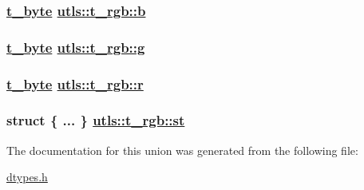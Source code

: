 \hypertarget{unionutls_1_1t__rgb_debb0d24da836f9eb6001f3889fac9d4}{
\subsubsection[b]{\setlength{\rightskip}{0pt plus 5cm}\hyperlink{namespaceutls_dc090f96c41011207bfa8d70a498322f}{t\_\-byte} \hyperlink{unionutls_1_1t__rgb_debb0d24da836f9eb6001f3889fac9d4}{utls::t\_\-rgb::b}}}
\label{unionutls_1_1t__rgb_debb0d24da836f9eb6001f3889fac9d4}


\hypertarget{unionutls_1_1t__rgb_4fc1c5d0c41a0f3117770b8872e07c6d}{
\subsubsection[g]{\setlength{\rightskip}{0pt plus 5cm}\hyperlink{namespaceutls_dc090f96c41011207bfa8d70a498322f}{t\_\-byte} \hyperlink{unionutls_1_1t__rgb_4fc1c5d0c41a0f3117770b8872e07c6d}{utls::t\_\-rgb::g}}}
\label{unionutls_1_1t__rgb_4fc1c5d0c41a0f3117770b8872e07c6d}


\hypertarget{unionutls_1_1t__rgb_ce6ec6d60cfbd757ec84e020e3b1671c}{
\subsubsection[r]{\setlength{\rightskip}{0pt plus 5cm}\hyperlink{namespaceutls_dc090f96c41011207bfa8d70a498322f}{t\_\-byte} \hyperlink{unionutls_1_1t__rgb_ce6ec6d60cfbd757ec84e020e3b1671c}{utls::t\_\-rgb::r}}}
\label{unionutls_1_1t__rgb_ce6ec6d60cfbd757ec84e020e3b1671c}


\hypertarget{unionutls_1_1t__rgb_f4692812e521eec39b7db2194f76ee17}{
\subsubsection[st]{\setlength{\rightskip}{0pt plus 5cm}struct \{ ... \}    \hyperlink{unionutls_1_1t__rgb_f4692812e521eec39b7db2194f76ee17}{utls::t\_\-rgb::st}}}
\label{unionutls_1_1t__rgb_f4692812e521eec39b7db2194f76ee17}




The documentation for this union was generated from the following file:\begin{CompactItemize}
\item 
\hyperlink{dtypes_8h}{dtypes.h}\end{CompactItemize}
